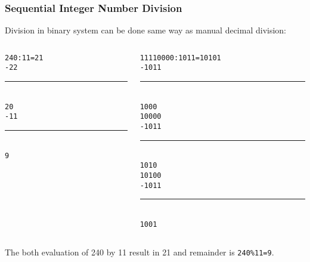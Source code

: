 \documentclass{beamer}
\begin{document}
\begin{frame}
\frametitle{Sequential Integer Number Division}

Division in binary system can be done same way as manual decimal division:
\bigskip
\begin{columns}
\begin{column}{0.4\textwidth}
\texttt{\phantom{-}240:11=21}\\
\texttt{-22}\\
\vspace{-8pt}
\rule[0pt]{1cm}{0.1pt}\\
\texttt{\phantom{xx}20}\\
\texttt{\phantom{x}-11}\\
\vspace{-8pt}
\rule[0pt]{1cm}{0.1pt}\\
\texttt{\phantom{xxx}9}\\
\end{column}
\hfill
\begin{column}{0.4\textwidth}
\texttt{\phantom{x}11110000:1011=10101}\\
\texttt{-1011}\\
\vspace{-8pt}
\rule[0pt]{1cm}{0.4pt}\\
\texttt{\phantom{xx}1000}\\
\texttt{\phantom{xx}10000}\\
\texttt{\phantom{xx}-1011}\\
\vspace{-8pt}
\rule[0pt]{1.4cm}{0.4pt}\\
\texttt{\phantom{xxxx}1010}\\
\texttt{\phantom{xxxx}10100}\\
\texttt{\phantom{xxxx}-1011}\\
\vspace{-8pt}
\rule[0pt]{1.8cm}{0.4pt}\\
\texttt{\phantom{xxxxx}1001}\\
\end{column}
\end{columns}
\bigskip
The both evaluation of 240 by 11 result in 21 and remainder is \texttt{240\%11=9}.

\end{frame}
\end{document}
